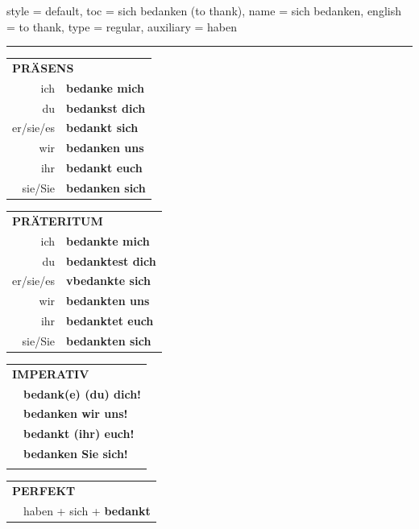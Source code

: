 \begin{verbentry}{
  style = {default},
  toc = {sich bedanken (to thank)},
  name = {sich bedanken},
  english = {to thank},
  type = {regular},
  auxiliary = {haben}
}
 
    
       \vspace{5pt}

    \hrule
    
    \vspace{5pt}

  \begin{tabular}{rl}
     \multicolumn{2}{l}{\textbf{PRÄSENS} }\\
    ich & \textbf{bedanke mich}\\
    du & \textbf{bedankst dich}\\
    er/sie/es & \textbf{bedankt sich}\\
    wir & \textbf{bedanken uns}\\
    ihr & \textbf{bedankt euch}\\
    sie/Sie & \textbf{bedanken sich}\\
  \end{tabular}
  \hfill
     \begin{tabular}{rl}
    \multicolumn{2}{l}{\textbf{PRÄTERITUM} }\\
    ich & \textbf{bedankte mich}\\
    du & \textbf{bedanktest dich}\\
    er/sie/es & \textbf{vbedankte sich}\\
    wir & \textbf{bedankten uns}\\
    ihr & \textbf{bedanktet euch}\\
    sie/Sie & \textbf{bedankten sich}\\
  \end{tabular}
  \hfill
  \begin{tabular}{rl}
     \multicolumn{2}{l}{\textbf{IMPERATIV} }\\
   & \textbf{bedank(e) (du) dich!}\\
   & \textbf{bedanken wir uns!}\\
   & \textbf{bedankt (ihr) euch!}\\
   & \textbf{bedanken Sie sich!}\\
   & \vspace{10pt}
  \end{tabular}

    \vspace{10pt}

 \begin{tabular}{rl}
     \multicolumn{2}{l}{\textbf{PERFEKT}}\\
    &haben + sich + \textbf{bedankt}\\
  \end{tabular}
\hfill
   \begin{tabular}{rl}
   

\end{tabular}
\end{verbentry}
